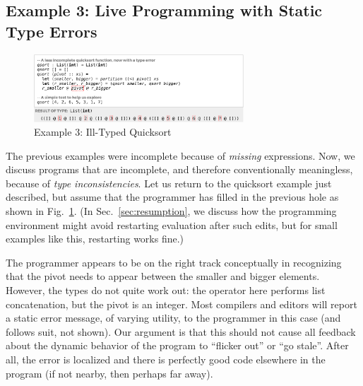 

\subsection{Example 3: Live Programming with Static Type Errors}


\begin{figure}
\centering
\includegraphics[width=0.7\textwidth,interpolate=false,valign=t]{images/qsort-type-error.png}
\caption{Example 3: Ill-Typed Quicksort}
\label{fig:qsort-type-error}
\vspace{-8px}
\end{figure}


The previous examples were incomplete 
because of \emph{missing} expressions.
%
Now, we discuss programs that are incomplete, 
and therefore conventionally meaningless, because of
\emph{type inconsistencies}. 
%
Let us return to the quicksort example just described, 
but assume that the programmer has filled in the previous hole
as shown in Fig.~\ref{fig:qsort-type-error}. (In Sec.~\ref{sec:resumption}, we discuss
how the programming environment might avoid restarting evaluation after such edits, but for small examples like this, restarting works fine.)

The programmer appears to be on the right track conceptually
in recognizing that the pivot needs to appear between the 
smaller and bigger elements. 
However, the types do not quite work out: the  operator here
performs list concatenation, but the pivot is an integer. 
Most compilers and editors will report a static error message, 
of varying utility, to the programmer in this case (and \Hazel 
follows suit, not shown). 
Our argument is that this should not cause all feedback about 
the dynamic behavior of the program to ``flicker out'' or ``go stale''. After all,
the error is localized and there is perfectly good code elsewhere 
in the program (if not nearby, then perhaps far away).

